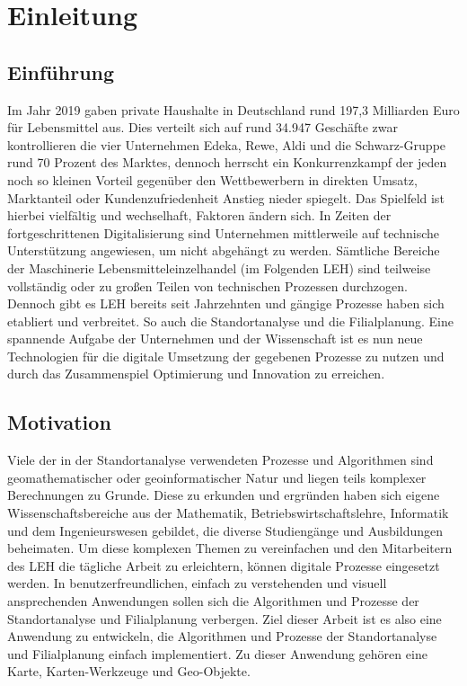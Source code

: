 \chapter{Einleitung}
\section{Einführung}
Im Jahr 2019 gaben private Haushalte in Deutschland rund 197,3 Milliarden Euro für Lebensmittel aus. \cite{statista2019Ausgaben}
Dies verteilt sich auf rund 34.947 Geschäfte zwar kontrollieren die vier Unternehmen Edeka, Rewe, Aldi und die Schwarz-Gruppe rund 70 Prozent des Marktes, dennoch herrscht ein Konkurrenzkampf der jeden noch so kleinen Vorteil gegenüber den Wettbewerbern in direkten Umsatz, Marktanteil oder Kundenzufriedenheit Anstieg nieder spiegelt.  \cite{statista2018Geschäfte}
Das Spielfeld ist hierbei vielfältig und wechselhaft, Faktoren ändern sich. In Zeiten der fortgeschrittenen Digitalisierung sind Unternehmen mittlerweile auf technische Unterstützung angewiesen, um nicht abgehängt zu werden. Sämtliche Bereiche der Maschinerie Lebensmitteleinzelhandel (im Folgenden LEH) sind teilweise vollständig oder zu großen Teilen von technischen Prozessen durchzogen.
Dennoch gibt es LEH bereits seit Jahrzehnten und gängige Prozesse haben sich etabliert und verbreitet. So auch die Standortanalyse und die Filialplanung. Eine spannende Aufgabe der Unternehmen und der Wissenschaft ist es nun neue Technologien für die digitale Umsetzung der gegebenen Prozesse zu nutzen und durch das Zusammenspiel Optimierung und Innovation zu erreichen. 

\section{Motivation}
Viele der in der Standortanalyse verwendeten Prozesse und Algorithmen sind geomathematischer oder geoinformatischer Natur und liegen teils komplexer Berechnungen zu Grunde.
Diese zu erkunden und ergründen haben sich eigene Wissenschaftsbereiche aus der Mathematik, Betriebswirtschaftslehre, Informatik und dem Ingenieurswesen gebildet, die diverse Studiengänge und Ausbildungen beheimaten.
Um diese komplexen Themen zu vereinfachen und den Mitarbeitern des LEH die tägliche Arbeit zu erleichtern, können digitale Prozesse eingesetzt werden.
In benutzerfreundlichen, einfach zu verstehenden und visuell ansprechenden Anwendungen sollen sich die Algorithmen und Prozesse der Standortanalyse und Filialplanung verbergen. 
Ziel dieser Arbeit ist es also eine Anwendung zu entwickeln, die Algorithmen und Prozesse der Standortanalyse und Filialplanung einfach implementiert. Zu dieser Anwendung gehören eine Karte, Karten-Werkzeuge und Geo-Objekte.



